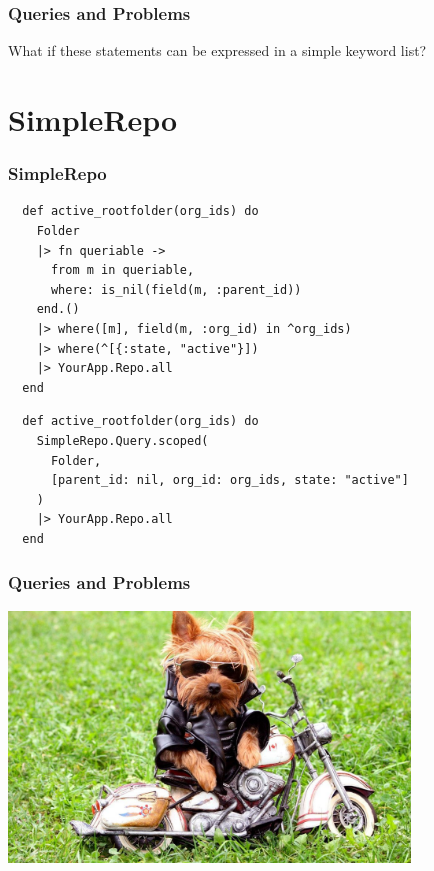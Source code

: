\documentclass{beamer}
\begin{document}
\begin{frame}[fragile]
\frametitle{Queries and Problems}
\centerline{What if these statements can be expressed in a simple keyword list?}
\end{frame}


\section{SimpleRepo} %

\begin{frame}[fragile]
\frametitle{SimpleRepo}
\begin{tiny}
\begin{verbatim}
  def active_rootfolder(org_ids) do
    Folder
    |> fn queriable ->
      from m in queriable,
      where: is_nil(field(m, :parent_id))
    end.()
    |> where([m], field(m, :org_id) in ^org_ids)
    |> where(^[{:state, "active"}])
    |> YourApp.Repo.all
  end
\end{verbatim}
\end{tiny}
\begin{verbatim}
  def active_rootfolder(org_ids) do
    SimpleRepo.Query.scoped(
      Folder,
      [parent_id: nil, org_id: org_ids, state: "active"]
    )
    |> YourApp.Repo.all
  end
\end{verbatim}
\end{frame}


\begin{frame}[fragile]
\frametitle{Queries and Problems}
\centerline{\includegraphics[width=0.8\textwidth]{cool_dog.jpg}}
\end{frame}
\end{document}
